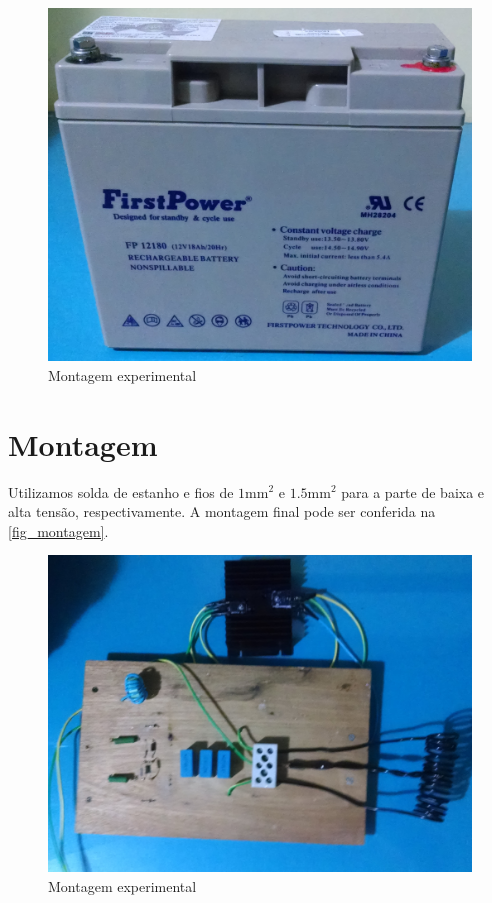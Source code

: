 \begin{figure}[h]
\caption{\label{fig_bateria}Montagem experimental}
\begin{center}
\includegraphics[scale=0.1]{images/bateria.jpg}
\end{center}
\end{figure}

\section{Montagem}
Utilizamos solda de estanho e fios de $1\mbox{mm}^2$ e $1.5\mbox{mm}^2$ para a parte de baixa e alta tensão, respectivamente. A montagem final pode ser conferida na \autoref{fig_montagem}.

\begin{figure}
\caption{\label{fig_montagem}Montagem experimental}
\begin{center}
\includegraphics[scale=0.1]{images/montagem.jpg}
\end{center}
\end{figure}